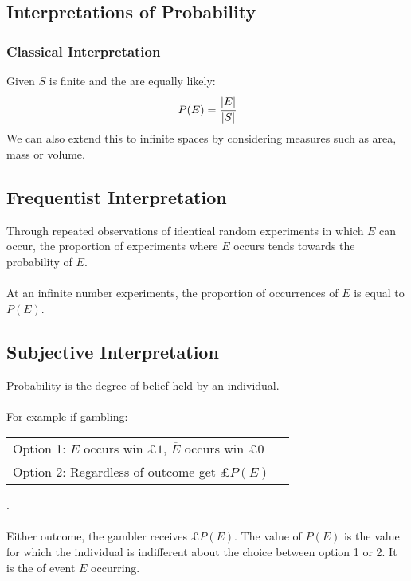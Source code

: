 \documentclass{report}
\begin{document}
        \subsection*{Interpretations of Probability}
            \subsubsection*{Classical Interpretation}
                
                Given $S$ is finite and the  are equally likely:
                \[P(E) = \cfrac{|E|}{|S|}\]                
                We can also extend this  to infinite spaces by considering measures such as area, mass or volume.
            
            \subsection*{Frequentist Interpretation}
                Through repeated observations of identical random experiments in which $E$ can occur, the proportion of experiments where $E$ occurs tends towards the probability of $E$.
                \\
                \\ At an infinite number experiments, the proportion of occurrences of $E$ is equal to $P(E)$.
            
            \subsection*{Subjective Interpretation}
                Probability is the degree of belief held by an individual.
                \\
                \\ For example if gambling: \begin{tabular}{l l}
                    Option 1: $E$ occurs win $£1$, $\overline{E}$ occurs win $£0$ \\
                    Option 2: Regardless of outcome get $£P(E)$ \\
                \end{tabular}.
                \\
                \\ Either outcome, the gambler receives $£P(E)$. The value of $P(E)$ is the value for which the individual is indifferent about the choice between option 1 or 2. It is the  of event $E$ occurring.
            
\end{document}
